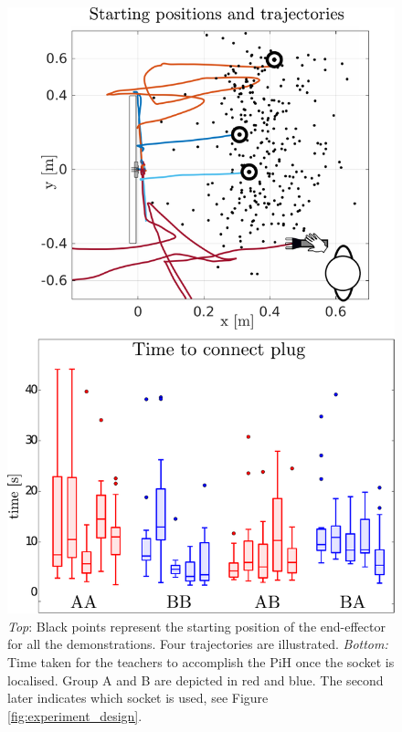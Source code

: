 \documentclass[final,3p,times,twocolumn]{elsarticle}
\begin{document}
\begin{figure}
 \centering
   \includegraphics[width=\textwidth]{./Figures/Fig/start_position_v2.pdf}
   \caption{\textit{Top}: Black points represent the starting position of the end-effector
   for all the demonstrations. Four trajectories are illustrated. \textit{Bottom:} 
   Time taken for the teachers to accomplish the PiH once the socket is localised. Group A and B are depicted in red 
   and blue. The second later indicates which socket is used, see Figure \ref{fig:experiment_design}.}
   
  \label{fig:experiment_setup_data}
\end{figure}
\end{document}
